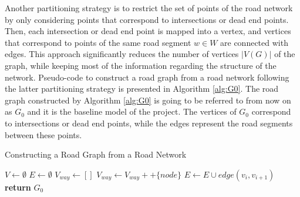 \documentclass[12pt]{article}
\theoremstyle{definition}
\begin{document}
Another partitioning strategy is to restrict the set of points of the road network by only considering points that correspond to intersections or dead end points. Then, each intersection or dead end point is mapped into a vertex, and vertices that correspond to points of the same road segment $w\in W$ are connected with edges. This approach significantly reduces the number of vertices $|V(G)|$ of the graph, while keeping most of the information regarding the structure of the network. Pseudo-code to construct a road graph from a road network following the latter partitioning strategy is presented in Algorithm \ref{alg:G0}. The road graph constructed by Algorithm \ref{alg:G0} is going to be referred to from now on as $G_0$ and it is the baseline model of the project. The vertices of $G_0$ correspond to intersections or dead end points, while the edges represent the road segments between these points.  



\begin{algorithm}
  \caption{Constructing a Road Graph from a Road Network}
  \label{alg:G0}
  \begin{algorithmic}
    \State $V \gets \emptyset$
    \State $E \gets \emptyset$
    \State \({V_{way}\gets []}\)
            \State \(V_{way} \gets V_{way} ++ \{node\}\)
            \EndIf
        \EndFor
    \State \(E \gets E \cup edge(v_i, v_{i+1})\)
    \EndFor
    \EndFor
    \State \textbf{return} {$G_0$}
    \EndProcedure
  \end{algorithmic}
\end{algorithm}
\end{document}
